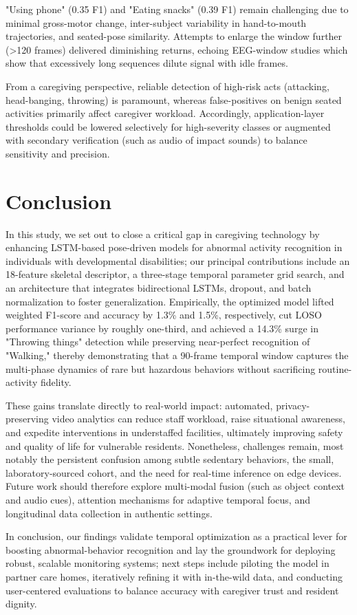 \documentclass{iopconfser}
\begin{document}
"Using phone" (0.35 F1) and "Eating snacks" (0.39 F1) remain challenging due to minimal gross-motor change, inter-subject variability in hand-to-mouth trajectories, and seated-pose similarity. Attempts to enlarge the window further (>120 frames) delivered diminishing returns, echoing EEG-window studies which show that excessively long sequences dilute signal with idle frames.

From a caregiving perspective, reliable detection of high-risk acts (attacking, head-banging, throwing) is paramount, whereas false-positives on benign seated activities primarily affect caregiver workload. Accordingly, application-layer thresholds could be lowered selectively for high-severity classes or augmented with secondary verification (such as audio of impact sounds) to balance sensitivity and precision.

\section{Conclusion}

In this study, we set out to close a critical gap in caregiving technology by enhancing LSTM-based pose-driven models for abnormal activity recognition in individuals with developmental disabilities; our principal contributions include an 18-feature skeletal descriptor, a three-stage temporal parameter grid search, and an architecture that integrates bidirectional LSTMs, dropout, and batch normalization to foster generalization. Empirically, the optimized model lifted weighted F1-score and accuracy by 1.3\% and 1.5\%, respectively, cut LOSO performance variance by roughly one-third, and achieved a 14.3\% surge in "Throwing things" detection while preserving near-perfect recognition of "Walking," thereby demonstrating that a 90-frame temporal window captures the multi-phase dynamics of rare but hazardous behaviors without sacrificing routine-activity fidelity.

These gains translate directly to real-world impact: automated, privacy-preserving video analytics can reduce staff workload, raise situational awareness, and expedite interventions in understaffed facilities, ultimately improving safety and quality of life for vulnerable residents. Nonetheless, challenges remain, most notably the persistent confusion among subtle sedentary behaviors, the small, laboratory-sourced cohort, and the need for real-time inference on edge devices. Future work should therefore explore multi-modal fusion (such as object context and audio cues), attention mechanisms for adaptive temporal focus, and longitudinal data collection in authentic settings.

In conclusion, our findings validate temporal optimization as a practical lever for boosting abnormal-behavior recognition and lay the groundwork for deploying robust, scalable monitoring systems; next steps include piloting the model in partner care homes, iteratively refining it with in-the-wild data, and conducting user-centered evaluations to balance accuracy with caregiver trust and resident dignity.



\end{document}
